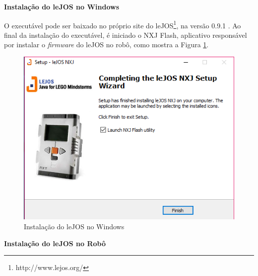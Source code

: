 	\textbf{Instalação do leJOS no Windows}

	O executável pode ser baixado no próprio site do leJOS\footnote{http://www.lejos.org/}, na versão 0.9.1 . Ao final da instalação do executável, é iniciado o NXJ Flash, aplicativo responsável por instalar o \textit{firmware} do leJOS no robô, como mostra a Figura \ref{lejosFinish}.
\FloatBarrier
\begin{figure}[!h]
\centering
\includegraphics[keepaspectratio=true,scale=0.7]{figuras/lejosFinish.png}
\caption{Instalação do leJOS no Windows}
\label{lejosFinish}
\end{figure}

	\textbf{Instalação do leJOS no Robô}


